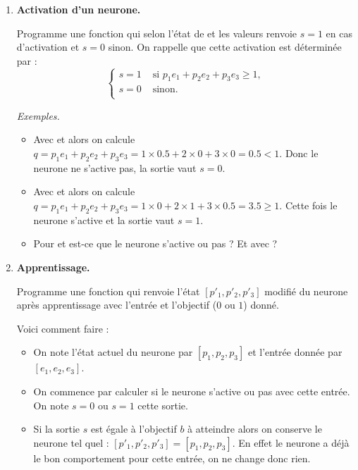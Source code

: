 \documentclass[10pt,class=report,crop=false]{standalone}
\begin{document}
\bigskip



\begin{activite}[Neurone]
	
	

\begin{enumerate}
	\item \textbf{Activation d'un neurone.}
	
	Programme une fonction 
	qui selon l'état de  et les valeurs 
	 renvoie $s=1$ en cas d'activation et $s=0$ sinon.
	On rappelle que cette activation est déterminée par :
	$$\left\{ 
	\begin{array}{rl}
	s=1  & \text{ si } p_1 e_1 + p_2e_2+p_3e_3 \ge 1, \\ 	
	s=0 & \text{ sinon.}\\
	\end{array}
	\right.$$ 
	
	\emph{Exemples.}
	\begin{itemize}
		\item Avec  et  alors
		on calcule $q = p_1 e_1 + p_2e_2+p_3e_3 = 1\times 0.5+2 \times 0 + 3\times 0 = 0.5 < 1$.
		Donc le neurone ne s'active pas, la sortie vaut $s=0$.
		
		\item Avec  et  alors
on calcule $q = p_1 e_1 + p_2e_2+p_3e_3 = 1\times 0 +2 \times 1 + 3\times 0.5 = 3.5 \ge 1$.
Cette fois le neurone s'active et la sortie vaut $s=1$.

		\item Pour  et  est-ce que le neurone s'active ou pas ? Et avec  ?
	\end{itemize}
	
	\item \textbf{Apprentissage.}
	
	Programme une fonction  qui renvoie l'état $[p'_1,p'_2,p'_3]$ modifié du neurone
	après apprentissage avec l'entrée et l'objectif ($0$ ou $1$) donné.
	
	Voici comment faire :
	\begin{itemize}
		\item On note l'état actuel du neurone par $[p_1,p_2,p_3]$ et l'entrée donnée par $[e_1,e_2,e_3]$.
		\item On commence par calculer si le neurone s'active ou pas avec cette entrée. On note $s=0$ ou $s=1$ cette sortie.
		\item Si la sortie $s$ est égale à l'objectif $b$ à atteindre alors on conserve le neurone tel quel : 
		$[p'_1,p'_2,p'_3] = [p_1,p_2,p_3]$. En effet le neurone a déjà le bon comportement pour cette entrée, on ne change donc rien.
		

\end{itemize}
\end{enumerate}
\end{activite}
\end{document}
